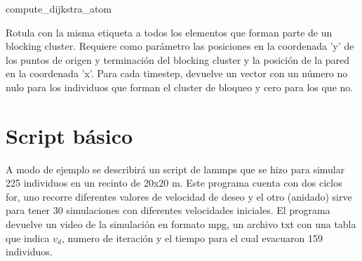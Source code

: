 {\Large compute\_dijkstra\_atom}

Rotula con la misma etiqueta a todos los elementos que forman parte de un blocking cluster. Requiere como parámetro las posiciones en la coordenada 'y' de los puntos de origen y terminación del blocking cluster y la posición de la pared en la coordenada 'x'. Para cada timestep, devuelve un vector con un número no nulo para los individuos que forman el cluster de bloqueo y cero para los que no. 

\section{Script básico}

A modo de ejemplo se describirá un script de lammps que se hizo para simular 225 individuos en un recinto de 20x20 m. Este programa cuenta con dos ciclos for, uno recorre diferentes valores de velocidad de deseo y el otro (anidado) sirve para tener 30 simulaciones con diferentes velocidades iniciales.  
El programa devuelve un video de la simulación en formato mpg, un archivo txt con una tabla que indica $v_d$, numero de iteración y el tiempo para el cual evacuaron 159 individuos. 

